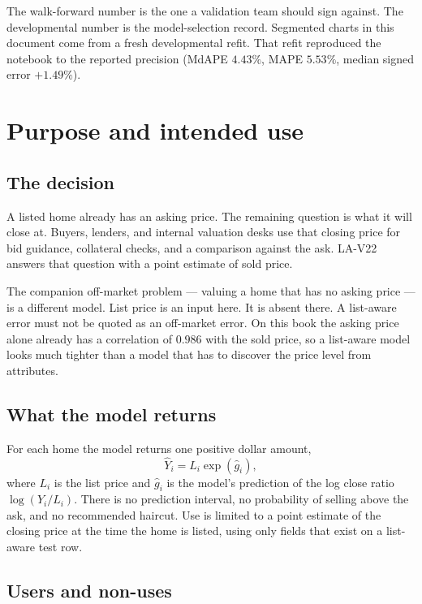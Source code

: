 \documentclass[11pt]{article}
\newcommand{\modelid}{LA-V22}
\begin{document}
The walk-forward number is the one a validation team should sign against. The developmental number is the model-selection record. Segmented charts in this document come from a fresh developmental refit. That refit reproduced the notebook to the reported precision (MdAPE \(4.43\%\), MAPE \(5.53\%\), median signed error \(+1.49\%\)).

\tableofcontents
\newpage

\section{Purpose and intended use}
\label{sec:purpose}

\subsection{The decision}

A listed home already has an asking price. The remaining question is what it will close at. Buyers, lenders, and internal valuation desks use that closing price for bid guidance, collateral checks, and a comparison against the ask. \modelid{} answers that question with a point estimate of sold price.

The companion off-market problem --- valuing a home that has no asking price --- is a different model. List price is an input here. It is absent there. A list-aware error must not be quoted as an off-market error. On this book the asking price alone already has a correlation of \(0.986\) with the sold price, so a list-aware model looks much tighter than a model that has to discover the price level from attributes.

\subsection{What the model returns}

For each home the model returns one positive dollar amount,
\[
\hat Y_i = L_i \exp(\hat g_i),
\]
where \(L_i\) is the list price and \(\hat g_i\) is the model's prediction of the log close ratio \(\log(Y_i/L_i)\). There is no prediction interval, no probability of selling above the ask, and no recommended haircut. Use is limited to a point estimate of the closing price at the time the home is listed, using only fields that exist on a list-aware test row.

\subsection{Users and non-uses}
\end{document}

